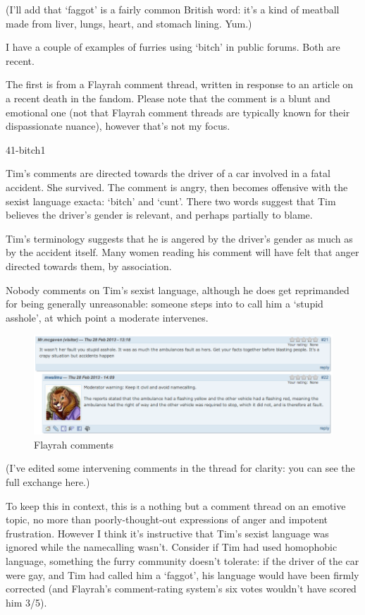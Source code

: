 (I'll add that `faggot' is a fairly common British word: it's a kind of meatball made from liver, lungs, heart, and stomach lining. Yum.)

I have a couple of examples of furries using `bitch' in public forums. Both are recent.

The first is from a Flayrah comment thread, written in response to an article on a recent death in the fandom. Please note that the comment is a blunt and emotional one (not that Flayrah comment threads are typically known for their dispassionate nuance), however that's not my focus.

41-bitch1

Tim's comments are directed towards the driver of a car involved in a fatal accident. She survived. The comment is angry, then becomes offensive with the sexist language exacta: `bitch' and `cunt'. There two words suggest that Tim believes the driver's gender is relevant, and perhaps partially to blame.

Tim's terminology suggests that he is angered by the driver's gender as much as by the accident itself. Many women reading his comment will have felt that anger directed towards them, by association.

Nobody comments on Tim's sexist language, although he does get reprimanded for being generally unreasonable: someone steps into to call him a `stupid asshole', at which point a moderate intervenes.

\begin{figure}
  \begin{center}
    \includegraphics[width=\textwidth]{content/assets/bitch--comments}
  \end{center}
  \caption{Flayrah comments}
\end{figure}

(I've edited some intervening comments in the thread for clarity: you can see the full exchange here.)

To keep this in context, this is a nothing but a comment thread on an emotive topic, no more than poorly-thought-out expressions of anger and impotent frustration. However I think it's instructive that Tim's sexist language was ignored while the namecalling wasn't. Consider if Tim had used homophobic language, something the furry community doesn't tolerate: if the driver of the car were gay, and Tim had called him a `faggot', his language would have been firmly corrected (and Flayrah's comment-rating system's six votes wouldn't have scored him 3/5).

